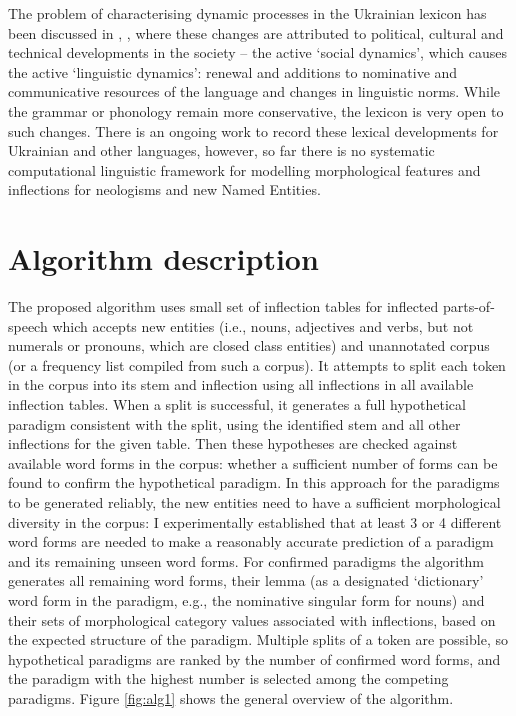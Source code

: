 \documentclass[11pt,a4paper]{article}
\begin{document}
The problem of characterising dynamic processes in the Ukrainian lexicon has been discussed in \cite{klymenko2008dynamichni}, \cite{karpilovska2013aktyvni}, where these changes are attributed to political, cultural and technical developments in the society -- the active `social dynamics', which causes the active `linguistic dynamics': renewal and additions to nominative and communicative resources of the language and changes in linguistic norms. While the grammar or phonology remain more conservative, the lexicon is very open to such changes. There is an ongoing work to record these lexical developments for Ukrainian and other languages, however, so far there is no systematic computational linguistic framework for modelling morphological features and inflections for neologisms and new Named Entities.

\section{Algorithm description}
\label{sec:Algorithm}

The proposed algorithm uses small set of inflection tables for inflected parts-of-speech which accepts new entities (i.e., nouns, adjectives and verbs, but not numerals or pronouns, which are closed class entities) and unannotated corpus (or a frequency list compiled from such a corpus). It attempts to split each token in the corpus into its stem and inflection using all inflections in all available inflection tables. When a split is successful, it generates a full hypothetical paradigm consistent with the split, using the identified stem and all other inflections for the given table. Then these hypotheses are checked against available word forms in the corpus: whether a sufficient number of forms can be found to confirm the hypothetical paradigm. In this approach for the paradigms to be generated reliably, the new entities need to have a sufficient morphological diversity in the corpus: I experimentally established that at least 3 or 4 different word forms are needed to make a reasonably accurate prediction of a paradigm and its remaining unseen word forms. For confirmed paradigms the algorithm generates all remaining word forms, their lemma (as a designated `dictionary' word form in the paradigm, e.g., the nominative singular form for nouns) and their sets of morphological category values associated with inflections, based on the expected structure of the paradigm. Multiple splits of a token are possible, so hypothetical paradigms are ranked by the number of confirmed word forms, and the paradigm with the highest number is selected among the competing paradigms. Figure \ref{fig:alg1} shows the general overview of the algorithm.
\end{document}
